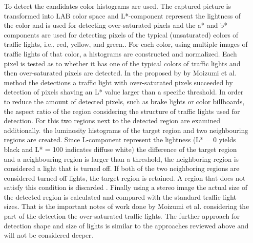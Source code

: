 \documentclass[letterpaper, 10 pt, conference]{ieeeconf} %
\begin{document}
To detect the candidates color histograms are used. The captured picture is transformed into LAB color space and L*-component represent the lightness of the color  and is used for detecting over-saturated pixels and the a* and b* components are used for detecting pixels of the typical (unsaturated) colors of traffic lights, i.e., red, yellow, and green.\cite{c3}. For each color, using multiple images of traffic lights of that color, a histograms are constructed and normalized. Each pixel is tested as to whether it has one of the typical colors of traffic lights and then over-saturated pixels are detected. In the proposed by by Moizumi et al. method the detections a traffic light with over-saturated pixels succeeded by detection of pixels shaving an L* value larger than a specific threshold. In order to reduce the amount of detected pixels, such as brake lights or color billboards, the aspect ratio of the region considering the structure of traffic lights used for detection. For this two regions next to the detected region are examined additionally. the luminosity histograms of the target region and two neighbouring regions are created. Since L-component represent the lightness (L* = 0 yields black and L* = 100 indicates diffuse white) the difference of the target region and a neighbouring region is larger than a threshold, the neighboring region is considered a light that is turned off. If both of the two neighboring regions are considered turned off lights, the target region is retained. A region that does not satisfy this condition is discarded \cite{c3}. Finally using a stereo image the actual size of the detected region is calculated and compared with the standard traffic light sizes. That is the important notes of work done by Moizumi et al. considering the part of the detection the over-saturated traffic lights. The further approach for detection shape and size of lights is similar to the approaches reviewed above and will not be considered deeper. 
\end{document}
